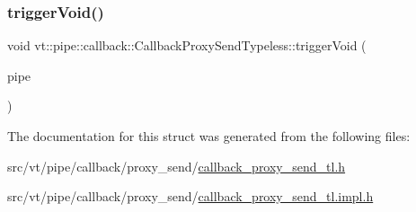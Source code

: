 \mbox{\label{structvt_1_1pipe_1_1callback_1_1_callback_proxy_send_typeless_a4d167bcbd52c771b8b48019dd192b0e6}} 
\subsubsection{\texorpdfstring{trigger\+Void()}{triggerVoid()}}
{\footnotesize\ttfamily void vt\+::pipe\+::callback\+::\+Callback\+Proxy\+Send\+Typeless\+::trigger\+Void (\begin{DoxyParamCaption}\item[{\mbox{[}\mbox{[}maybe\+\_\+unused\mbox{]} \mbox{]} \hyperlink{namespacevt_ac9852acda74d1896f48f406cd72c7bd3}{Pipe\+Type} const \&}]{pipe }\end{DoxyParamCaption})\hspace{0.3cm}{\ttfamily [inline]}}



The documentation for this struct was generated from the following files\+:\begin{DoxyCompactItemize}
\item 
src/vt/pipe/callback/proxy\+\_\+send/\hyperlink{callback__proxy__send__tl_8h}{callback\+\_\+proxy\+\_\+send\+\_\+tl.\+h}\item 
src/vt/pipe/callback/proxy\+\_\+send/\hyperlink{callback__proxy__send__tl_8impl_8h}{callback\+\_\+proxy\+\_\+send\+\_\+tl.\+impl.\+h}\end{DoxyCompactItemize}
